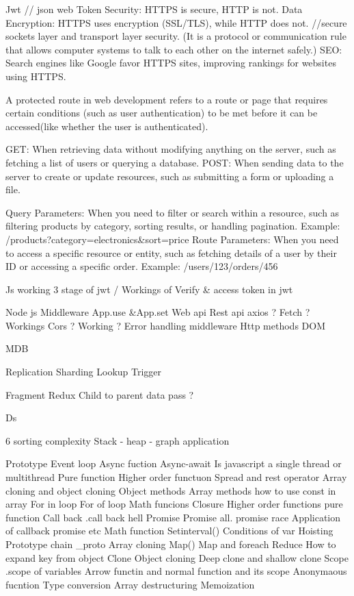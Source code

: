 
Jwt  // json web Token 
Security: HTTPS is secure, HTTP is not.
Data Encryption: HTTPS uses encryption (SSL/TLS), while HTTP does not. //secure sockets layer and transport layer security. 
(It is a protocol or communication rule that allows computer systems to talk to each other on the internet safely.)
SEO: Search engines like Google favor HTTPS sites, improving rankings for websites using HTTPS.

A protected route in web development refers to a route or page that requires certain conditions 
(such as user authentication) to be met before it can be accessed(like whether the user is authenticated).

GET: When retrieving data without modifying anything on the server, such as fetching a list of users or querying a database.
POST: When sending data to the server to create or update resources, such as submitting a form or uploading a file.


Query Parameters: When you need to filter or search within a resource, such as filtering products by category, sorting results, or handling pagination.
Example: /products?category=electronics&sort=price
Route Parameters: When you need to access a specific resource or entity, such as fetching details of a user by their ID or accessing a specific order.
Example: /users/123/orders/456


Js working
3 stage of jwt /
Workings of Verify & access token in jwt 


Node js
Middleware
App.use &App.set
Web api
Rest api
axios ? Fetch ? Workings
Cors ? Working ?
Error handling middleware
Http methods
DOM 

MDB

Replication
Sharding
Lookup
Trigger



Fragment
Redux
Child to parent data pass ?


Ds 

6 sorting complexity 
Stack - heap - graph application

Prototype
Event loop
Async fuction
Async-await
Is javascript a single thread or multithread
Pure function
Higher order functuon
Spread and rest operator
Array cloning  and object cloning
Object methods
Array methods
 how to use const in array
For in loop
For of loop
Math funcions
Closure
Higher order functions pure function
Call back
.call back hell
Promise
Promise all.
promise race
Application of callback promise etc
Math function
Setinterval()
Conditions of var
Hoisting
Prototype chain
_proto
Array cloning
Map()
Map and foreach
Reduce
How to expand key from object
Clone
Object cloning
Deep clone and shallow clone
Scope
.scope of variables
Arrow functin and normal function and its scope
Anonymaous fucntion
Type conversion
Array destructuring
Memoization

